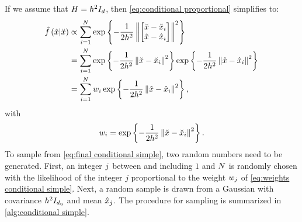 If we assume that $H=h^2I_{d}$, then \cref{eq:conditional proportional} simplifies to:
\begin{align}
	\hat{f}\left(  \hat{x} | \breve{x}  \right) 
	&\propto \sum_{i=1}^{N}
	\exp\left\{ 
		-\frac{1}{2h^2} \left\Vert 
			\begin{bmatrix}
				\breve{x} - \breve{x}_{i} \\ 
				\hat{x} - \hat{x}_{i}
			\end{bmatrix}
		 \right\Vert^2
	 \right\} \\
	&= \sum_{i=1}^{N}
	\exp\left\{ -\frac{1}{2h^2} \left\Vert \breve{x} - \breve{x}_{i} \right\Vert^2 \right\}
	\exp\left\{ -\frac{1}{2h^2} \left\Vert \hat{x} - \hat{x}_{i} \right\Vert^2 \right\} \\
	&= \sum_{i=1}^{N} w_{i}
	\exp\left\{ -\frac{1}{2h^2} \left\Vert \hat{x} - \hat{x}_{i} \right\Vert^2 \right\}, \label{eq:final conditional simple}
\end{align}
with 
\begin{equation}
	\label{eq:weights conditional simple}
	w_{i}=\exp\left\{ -\frac{1}{2h^2} \left\Vert \breve{x} - \breve{x}_{i} \right\Vert^2 \right\}.
\end{equation} 
To sample from \cref{eq:final conditional simple}, two random numbers need to be generated. 
First, an integer $j$ between and including $1$ and $N$ is randomly chosen with the likelihood of the integer $j$ proportional to the weight $w_{j}$ of \cref{eq:weights conditional simple}. 
Next, a random sample is drawn from a Gaussian with covariance $h^2 I_{d_\mathrm{u}}$ and mean $\hat{x}_{j}$.
The procedure for sampling is summarized in \cref{alg:conditional simple}.


